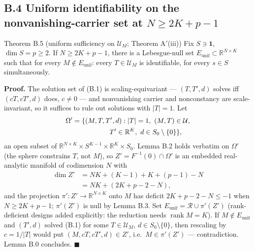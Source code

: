 \subsection{B.4 Uniform identifiability on the nonvanishing-carrier set at \texorpdfstring{$N\ge 2K+p-1$}{N >= 2K+p-1}}

\begin{namedthm}{Theorem B.5 (uniform sufficiency on $\mathcal U_M$; Theorem A$'$(iii))}
Fix $S\ni\mathbf 1$, $\dim S=p\ge2$. If $N\ge 2K+p-1$, there is a Lebesgue-null set $E_{\mathrm{unif}}\subset\mathbb R^{N\times K}$ such that for every $M\notin E_{\mathrm{unif}}$: every $T\in\mathcal U_M$ is identifiable, for every $s\in S$ simultaneously.
\end{namedthm}

\noindent\textbf{Proof.} The solution set of (B.1) is scaling-equivariant --- $(T,T',d)$ solves iff $(cT,cT',d)$ does, $c\neq0$ --- and nonvanishing carrier and nonconstancy are scale-invariant, so it suffices to rule out solutions with $|T|=1$. Let
\[
\begin{gathered}
\Omega'=\{(M,T,T',d):|T|=1,\ (M,T)\in\mathcal U,\\
\hspace{5.2em} T'\in\mathbb R^K,\ d\in S_0\setminus\{0\}\},
\end{gathered}
\]
an open subset of $\mathbb R^{N\times K}\times S^{K-1}\times\mathbb R^K\times S_0$. Lemma B.2 holds verbatim on $\Omega'$ (the sphere constrains $T$, not $M$), so $Z'=F^{-1}(0)\cap\Omega'$ is an embedded real-analytic manifold of codimension $N$ with
\[
\begin{aligned}
\dim Z'&=NK+(K-1)+K+(p-1)-N\\
&=NK+(2K+p-2-N),
\end{aligned}
\]
and the projection $\pi':Z'\to\mathbb R^{N\times K}$ onto $M$ has deficit $2K+p-2-N\le-1$ when $N\ge2K+p-1$; $\pi'(Z')$ is null by Lemma B.3. Set $E_{\mathrm{unif}}=\mathcal R\cup\pi'(Z')$ (rank-deficient designs added explicitly: the reduction needs $\operatorname{rank}M=K$). If $M\notin E_{\mathrm{unif}}$ and $(T',d)$ solved (B.1) for some $T\in\mathcal U_M$, $d\in S_0\setminus\{0\}$, then rescaling by $c=1/|T|$ would put $(M,cT,cT',d)\in Z'$, i.e.\ $M\in\pi'(Z')$ --- contradiction. Lemma B.0 concludes. \hfill$\blacksquare$

